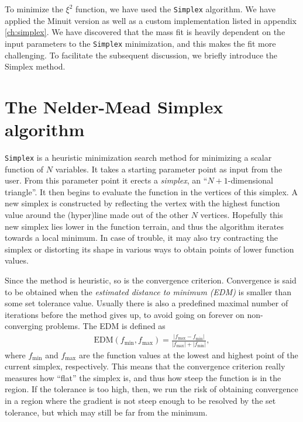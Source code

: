 \documentclass[twoside,english]{uiofysmaster}
\begin{document}
To minimize the $\xi^2$ function, we have used the {\tt Simplex} algorithm. We have applied the Minuit version as well as a custom implementation listed in appendix \ref{ch:simplex}. We have discovered that the mass fit is heavily dependent on the input parameters to the {\tt Simplex} minimization, and this makes the fit more challenging. To facilitate the subsequent discussion, we briefly introduce the Simplex method.

\section{The Nelder-Mead Simplex algorithm}

{\tt Simplex} \cite{nelder1965simplex} is a heuristic minimization search method for minimizing a scalar function of $N$ variables. It takes a starting parameter point as input from the user. From this parameter point it erects a {\it simplex}, an ``$N+1$-dimensional triangle''. It then begins to evaluate the function in the vertices of this simplex. A new simplex is constructed by reflecting the vertex with the highest function value around the (hyper)line made out of the other $N$ vertices. Hopefully this new simplex lies lower in the function terrain, and thus the algorithm iterates towards a local minimum. In case of trouble, it may also try contracting the simplex or distorting its shape in various ways to obtain points of lower function values. 

Since the method is heuristic, so is the convergence criterion. Convergence is said to be obtained when the {\it estimated distance to minimum (EDM)} is smaller than some set tolerance value. Usually there is also a predefined maximal number of iterations before the method gives up, to avoid going on forever on non-converging problems. The EDM is defined as
\begin{align}
	\mathrm{EDM}(f_\mathrm{min},f_\mathrm{max}) = \frac{|f_\mathrm{max}-f_\mathrm{min}|}{|f_\mathrm{max}| + |f_\mathrm{min}|},
\end{align}
where $f_\mathrm{min}$ and $f_\mathrm{max}$ are the function values at the lowest and highest point of the current simplex, respectively. This means that the convergence criterion really measures how ``flat'' the simplex is, and thus how steep the function is in the region. If the tolerance is too high, then, we run the risk of obtaining convergence in a region where the gradient is not steep enough to be resolved by the set tolerance, but which may still be far from the minimum.
\end{document}
